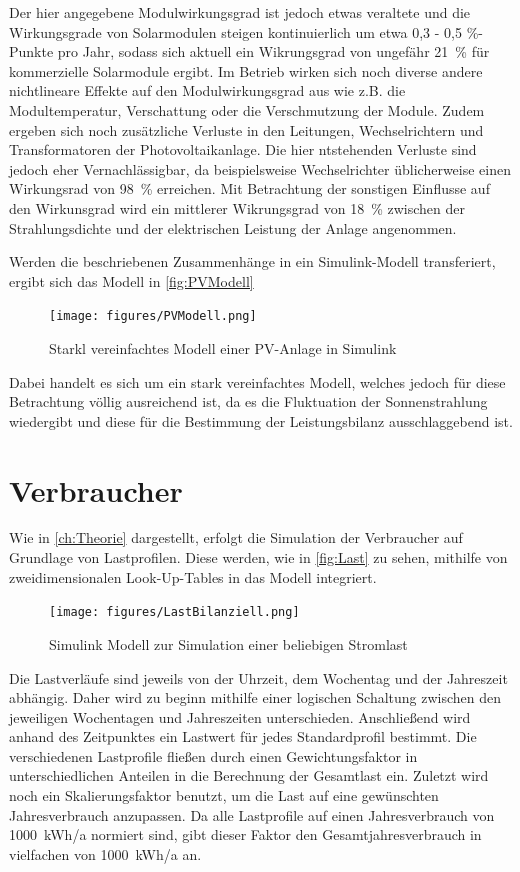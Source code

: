Der hier angegebene Modulwirkungsgrad ist jedoch etwas veraltete und die Wirkungsgrade von Solarmodulen steigen kontinuierlich um etwa 0,3 - 0,5 \%-Punkte pro Jahr, sodass sich aktuell ein Wikrungsgrad von ungefähr 21~\% für kommerzielle Solarmodule ergibt. Im Betrieb wirken sich noch diverse andere nichtlineare Effekte auf den Modulwirkungsgrad aus wie z.B. die Modultemperatur, Verschattung oder die Verschmutzung der Module. Zudem ergeben sich noch zusätzliche Verluste in den Leitungen, Wechselrichtern und Transformatoren der Photovoltaikanlage. Die hier ntstehenden Verluste sind jedoch eher Vernachlässigbar, da beispielsweise Wechselrichter üblicherweise einen Wirkungsrad von 98~\% erreichen. Mit Betrachtung der sonstigen Einflusse auf den Wirkunsgrad wird ein mittlerer Wikrungsgrad von 18~\% zwischen der Strahlungsdichte und der elektrischen Leistung der Anlage angenommen. \cite{FaktenPV} 

Werden die beschriebenen Zusammenhänge in ein Simulink-Modell transferiert, ergibt sich das Modell in \autoref{fig:PVModell}

\begin{figure}[H]
	\centering
	\texttt{[image: figures/PVModell.png]}
	\caption{Starkl vereinfachtes Modell einer PV-Anlage in Simulink}
	\label{fig:PVModell}
\end{figure}

Dabei handelt es sich um ein stark vereinfachtes Modell, welches jedoch für diese Betrachtung völlig ausreichend ist, da es die Fluktuation der Sonnenstrahlung wiedergibt und diese für die Bestimmung der Leistungsbilanz ausschlaggebend ist.

\section{Verbraucher}

Wie in \autoref{ch:Theorie} dargestellt, erfolgt die Simulation der Verbraucher auf Grundlage von Lastprofilen. Diese werden, wie in \autoref{fig:Last} zu sehen, mithilfe von zweidimensionalen Look-Up-Tables in das Modell integriert. 

\begin{figure}[H]
	\centering
	\texttt{[image: figures/LastBilanziell.png]}
	\caption{Simulink Modell zur Simulation einer beliebigen Stromlast}
	\label{fig:Last}
\end{figure}

Die Lastverläufe sind jeweils von der Uhrzeit, dem Wochentag und der Jahreszeit abhängig. Daher wird zu beginn mithilfe einer logischen Schaltung zwischen den jeweiligen Wochentagen und Jahreszeiten unterschieden. Anschließend wird anhand des Zeitpunktes ein Lastwert für jedes Standardprofil bestimmt. Die verschiedenen Lastprofile fließen durch einen Gewichtungsfaktor in unterschiedlichen Anteilen in die Berechnung der Gesamtlast ein. Zuletzt wird noch ein Skalierungsfaktor benutzt, um die Last auf eine gewünschten Jahresverbrauch anzupassen. Da alle Lastprofile auf einen Jahresverbrauch von 1000~kWh/a normiert sind, gibt dieser Faktor den Gesamtjahresverbrauch in vielfachen von 1000~kWh/a an.
